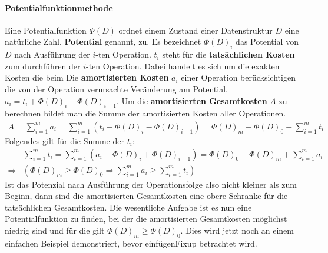 \documentclass[a4paper,12pt]{article}
\begin{document}
\paragraph{Potentialfunktionmethode} Eine Potentialfunktion $\Phi(D)$ ordnet einem Zustand einer Datenstruktur $D$ eine natürliche Zahl, \textbf{Potential} genannt, zu. Es bezeichnet $\Phi(D)_{i}$ das Potential von $D$ nach Ausführung der $i$-ten Operation. $t_i$ steht für die \textbf{tatsächlichen Kosten} zum durchführen der $i$-ten Operation. Dabei handelt es sich um die exakten Kosten die beim Die \textbf{amortisierten Kosten} $a_i$ einer Operation berücksichtigen die von der Operation verursachte Veränderung am Potential, $a_i = t_i + \Phi(D)_{i} - \Phi(D)_{i-1}$. Um die \textbf{amortisierten Gesamtkosten} $A$ zu berechnen bildet man die Summe der amortisierten Kosten aller Operationen. 
\begin{align*}
A = \sum_{i = 1}^{m} a_i =  \sum_{i = 1}^{m} \left(t_i + \Phi\left(D\right)_{i} - \Phi\left(D\right)_{i-1}\right) = \Phi\left(D\right)_{m} - \Phi\left(D\right)_{0} + \sum_{i = 1}^{m} t_i 
\end{align*}
Folgendes gilt für die Summe der $t_i$:
\begin{align*}
&\sum_{i = 1}^{m} t_i =  \sum_{i = 1}^{m} \left(a_i - \Phi\left(D\right)_{i} + \Phi\left(D\right)_{i-1}\right) = \Phi\left(D\right)_{0} - \Phi\left(D\right)_{m} + \sum_{i = 1}^{m} a_i \\
\Rightarrow &\left( \Phi\left(D\right)_{m} \geq \Phi\left(D\right)_{0} \Rightarrow \sum_{i = 1}^{m} a_i \geq \sum_{i = 1}^{m} t_i \right)
\end{align*}
Ist das Potenzial nach Ausführung der Operationsfolge also nicht kleiner als zum Beginn, dann sind die amortisierten Gesamtkosten eine obere Schranke für die tatsächlichen Gesamtkosten. Die wesentliche Aufgabe ist es nun eine Potentialfunktion zu finden, bei der die amortisierten Gesamtkosten möglichst niedrig sind und für die gilt $\Phi\left(D\right)_{m} \geq \Phi\left(D\right)_{0}$. Dies wird jetzt noch an einem einfachen Beispiel demonstriert, bevor einfügenFixup betrachtet wird. 
\end{document}
